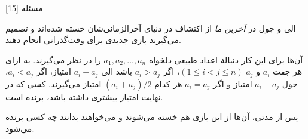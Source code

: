 ‌مسئله [15]

% 
%
%
% 

الی و جول در \textit{آخرین ما} از اکتشاف در دنیای آخرالزمانی‌شان خسته شده‌اند و تصمیم می‌گیرند بازی جدیدی برای وقت‌گذرانی انجام دهند.

آن‌ها برای این کار دنبالۀ اعداد طبیعی دلخواه $a_1,a_2,\dots ,a_n$ را در نظر می‌گیرند. به ازای هر جفت $a_i$ و $a_j$ $(1\le i<j\le n)$، اگر $a_i>a_j$ باشد الی $a_i+a_j$ امتیاز، اگر $a_i<a_j$، جول $a_i+a_j$ امتیاز و اگر $a_i=a_j$ هر کدام $(a_i + a_j) / 2$ امتیاز می‌گیرند. کسی که در نهایت امتیاز بیشتری داشته باشد، برنده است. 

پس از مدتی، آن‌ها از این بازی هم خسته می‌‌شوند و می‌خواهند بدانند چه کسی برنده می‌شود.

